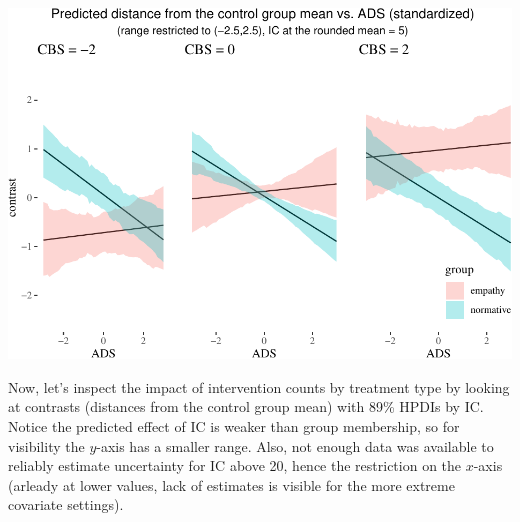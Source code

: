 \documentclass[10pt,dvipsnames,enabledeprecatedfontcommands]{scrartcl}
\begin{document}
\begin{center}\includegraphics[width=1\linewidth]{bayesianReport3_files/figure-latex/unnamed-chunk-14-1} \end{center}

\normalsize

Now, let's inspect the impact of intervention counts by treatment type
by looking at contrasts (distances from the control group mean) with
89\% HPDIs by IC. Notice the predicted effect of \textsf{IC} is weaker
than group membership, so for visibility the \(y\)-axis has a smaller
range. Also, not enough data was available to reliably estimate
uncertainty for \textsf{IC} above 20, hence the restriction on the
\(x\)-axis (arleady at lower values, lack of estimates is visible for
the more extreme covariate settings).

\vspace{1mm} \footnotesize
\end{document}
